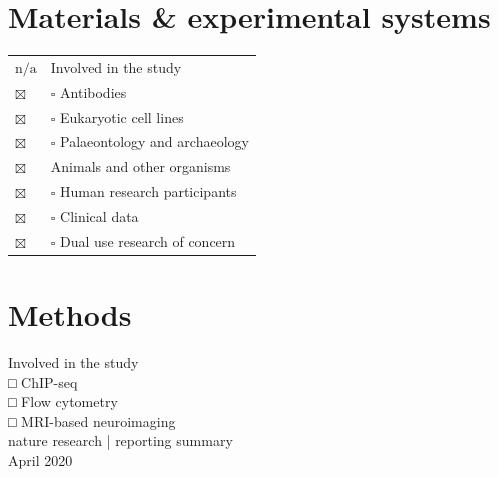 \documentclass[10pt]{article}
\begin{document}
\section*{Materials \& experimental systems}
\begin{center}
\begin{tabular}{l|l}
$\mathrm{n} / \mathrm{a}$ & Involved in the study \\
$\boxtimes$ & $\square$ Antibodies \\
$\boxtimes$ & $\square$ Eukaryotic cell lines \\
$\boxtimes$ & $\square$ Palaeontology and archaeology \\
$\boxtimes$ & Animals and other organisms \\
$\boxtimes$ & $\square$ Human research participants \\
$\boxtimes$ & $\square$ Clinical data \\
$\boxtimes$ & $\square$ Dual use research of concern \\
\end{tabular}
\end{center}

\section*{Methods}
Involved in the study\\
□ ChIP-seq\\
□ Flow cytometry\\
□ MRI-based neuroimaging\\
nature research | reporting summary\\
April 2020
\end{document}

